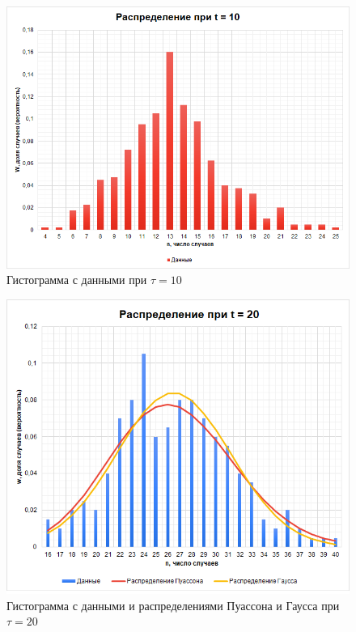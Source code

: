 \documentclass[a4paper]{article}
\begin{document}
\begin{figure}[t]
    \centering
    \includegraphics[width=1\textwidth]{t10}
    \caption{Гистограмма с данными при $\tau = 10$}
\end{figure}

\begin{figure}[t]
    \centering
    \includegraphics[width=1\textwidth]{t20}
    \caption{Гистограмма с данными и распределениями Пуассона и Гаусса при $\tau = 20$}
\end{figure}
\end{document}
